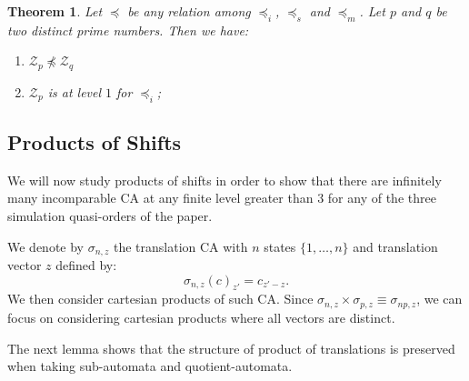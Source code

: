 \documentclass[a4paper]{elsarticle}
\def\qed{\relax\ifmmode\hskip2em \blacksquare\else\unskip\nobreak\hfill\hskip1em $\blacksquare$\fi}
\newcommand{\ACA}{\mathcal{A}}
\newcommand\sac{\sqsubseteq}
\newcommand{\fac}{\trianglelefteq}
\newcommand\bulk[2]{{#1}^{\left\langle{#2}\right\rangle}}
\newcommand{\simu}{\preccurlyeq}
\newcommand{\sacsimu}{\simu_i}
\newcommand{\facsimu}{\simu_s}
\newcommand{\facsacsimu}{\simu_m}
\newcommand{\isom}{\equiv}
\newcommand\grporder{\leqslant_\square}
\newcommand\grp[2]{{#1}^{[#2]}}
\newcommand\zee[1]{\mathcal{Z}_{#1}}
\newcommand\shi[2]{\sigma_{{#1},{#2}}}
\newtheorem{thm}{Theorem}[section]
\begin{document}
\begin{thm}
  \label{thm:zpz}
  Let $\simu$ be any relation among $\sacsimu$, $\facsimu$ and
  $\facsacsimu$.  Let $p$ and $q$ be two distinct prime numbers. Then
  we have:
  \begin{enumerate}
  \item $\zee{p}\not\simu\zee{q}$
  \item $\zee{p}$ is at level $1$ for $\sacsimu$;
  \end{enumerate}
\end{thm}

\subsection{Products of Shifts}
\label{sec:botshi}


We will now study products of shifts in order to show that there are
infinitely many incomparable CA at any finite level greater than 3 for
any of the three simulation quasi-orders of the paper.

We denote by ${\shi{n}{z}}$ the translation CA with $n$ states
${\{1,\ldots,n\}}$ and translation vector $z$ defined by:
\[\shi{n}{z}(c)_{z'} = c_{z'-z}.\]
We then consider cartesian products of such CA. Since
${\shi{n}{z}\times\shi{p}{z}\isom\shi{np}{z}}$, we can focus on
considering cartesian products where all vectors are distinct.


The next lemma shows that the structure of product of translations is
preserved when taking sub-automata and quotient-automata.
\end{document}
